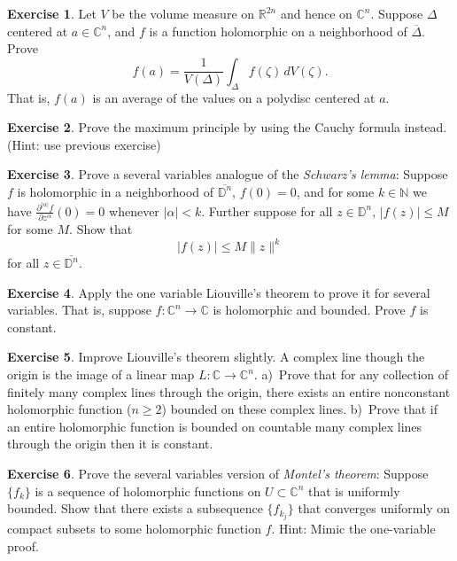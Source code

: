 \documentclass[12pt,openany]{book}
\newcommand{\sabs}[1]{\lvert {#1} \rvert}
\newcommand{\snorm}[1]{\lVert {#1} \rVert}
\newcommand{\C}{{\mathbb{C}}}
\newcommand{\R}{{\mathbb{R}}}
\newcommand{\N}{{\mathbb{N}}}
\newcommand{\D}{{\mathbb{D}}}
\newcommand{\myindex}[1]{#1\index{#1}}
\theoremstyle{plain}
\theoremstyle{remark}
\theoremstyle{definition}
\newenvironment{exbox}{%
    \def\FrameCommand{\vrule width 1pt \relax\hspace {10pt}}%
    \MakeFramed {\advance \hsize -\width \FrameRestore }%
}{%
    \endMakeFramed
}
\theoremstyle{exercise}
\newtheorem{exercise}{Exercise}[section]
\theoremstyle{example}
\begin{document}
\begin{exbox}
\begin{exercise} \label{exercise:averageDelta}
Let $V$ be the volume measure on $\R^{2n}$ and hence on $\C^n$.
Suppose $\Delta$ centered at $a \in \C^n$, and $f$ is a function holomorphic on
a neighborhood of $\overline{\Delta}$.  Prove
\begin{equation*}
f(a) =
\frac{1}{V(\Delta)}
\int_{\Delta} f(\zeta) \, dV(\zeta) .
\end{equation*}
That is, $f(a)$ is an average of the values on a polydisc centered at $a$.
\end{exercise}

\begin{exercise}
Prove the maximum principle by using the Cauchy formula instead.  (Hint:
use previous exercise)
\end{exercise}

\begin{exercise}
Prove a several variables analogue of the \emph{\myindex{Schwarz's lemma}}:
Suppose $f$ is holomorphic in a neighborhood of $\overline{\D^n}$,
$f(0) = 0$, and for some $k \in \N$ we have
$\frac{\partial^{\sabs{\alpha}} f}{\partial z^\alpha} (0) =
0$ whenever $\sabs{\alpha} < k$.  Further suppose 
for all $z \in \D^n$,
$\sabs{f(z)} \leq M$ for some $M$.  Show that
\begin{equation*}
\sabs{f(z)} \leq M \snorm{z}^k
\end{equation*}
for all $z \in \overline{\D^n}$.
\end{exercise}

\begin{exercise}
Apply the one variable Liouville's theorem to prove it for several variables.
That is, suppose $f \colon \C^n \to \C$ is holomorphic and bounded.
Prove $f$ is constant.
\end{exercise}

\begin{exercise}
Improve Liouville's theorem slightly.  A complex line though the origin is
the image of a linear map $L \colon \C \to \C^n$.  a)~Prove that 
for any collection of finitely many complex lines through the origin,
there exists an entire nonconstant holomorphic function ($n \geq 2$)
bounded on these complex lines.
b)~Prove that if an entire holomorphic function is bounded on countable many
complex lines through the origin then it is constant.
\end{exercise}

\begin{exercise}
Prove the several variables version of \emph{\myindex{Montel's theorem}}:
Suppose $\{ f_k \}$ is a sequence of holomorphic functions on $U
\subset \C^n$ that is uniformly bounded.
Show that there exists a subsequence $\{ f_{k_j} \}$ that converges
uniformly on compact subsets to some holomorphic function $f$.
Hint: Mimic the one-variable proof.
\end{exercise}


\end{exbox}
\end{document}
